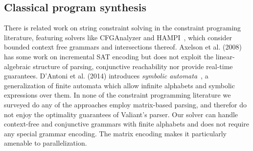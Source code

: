 \documentclass[sigplan,review,anonymous,acmsmall]{acmart}\settopmatter{printfolios=false,printccs=false,printacmref=false}
\begin{document}

%

\subsection{Classical program synthesis}

There is related work on string constraint solving in the constraint programing literature, featuring solvers like CFGAnalyzer and HAMPI~\cite{kiezun2009hampi}, which consider bounded context free grammars and intersections thereof. Axelson et al. (2008)~\cite{axelsson2008analyzing} has some work on incremental SAT encoding but does not exploit the linear-algebraic structure of parsing, conjunctive reachability nor provide real-time guarantees. D'Antoni et al. (2014) introduces \textit{symbolic automata}~\cite{dantoni2014minimization}, a generalization of finite automata which allow infinite alphabets and symbolic expressions over them. In none of the constraint programming literature we surveyed do any of the approaches employ matrix-based parsing, and therefor do not enjoy the optimality guarantees of Valiant's parser. Our solver can handle context-free and conjunctive grammars with finite alphabets and does not require any special grammar encoding. The matrix encoding makes it particularly amenable to parallelization.
\end{document}
